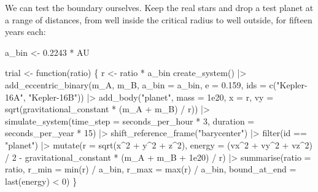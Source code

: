 \documentclass[
  10.5pt,
  letterpaper,
]{scrbook}
\newenvironment{Shaded}{\begin{snugshade}}{\end{snugshade}}
\newcommand{\AttributeTok}[1]{\textcolor[rgb]{0.00,0.00,0.00}{#1}}
\newcommand{\ControlFlowTok}[1]{\textcolor[rgb]{0.00,0.00,0.00}{#1}}
\newcommand{\DecValTok}[1]{\textcolor[rgb]{0.00,0.00,0.00}{#1}}
\newcommand{\FloatTok}[1]{\textcolor[rgb]{0.00,0.00,0.00}{#1}}
\newcommand{\FunctionTok}[1]{\textcolor[rgb]{0.00,0.00,0.00}{#1}}
\newcommand{\NormalTok}[1]{\textcolor[rgb]{0.00,0.00,0.00}{#1}}
\newcommand{\OtherTok}[1]{\textcolor[rgb]{0.00,0.00,0.00}{#1}}
\newcommand{\SpecialCharTok}[1]{\textcolor[rgb]{0.00,0.00,0.00}{#1}}
\newcommand{\StringTok}[1]{\textcolor[rgb]{0.00,0.00,0.00}{#1}}
\theoremstyle{plain}
\theoremstyle{remark}
\begin{document}
We can test the boundary ourselves. Keep the real stars and drop a test
planet at a range of distances, from well inside the critical radius to
well outside, for fifteen years each:

\begin{Shaded}
\begin{Highlighting}[]
\NormalTok{a\_bin }\OtherTok{\textless{}{-}} \FloatTok{0.2243} \SpecialCharTok{*}\NormalTok{ AU}

\NormalTok{trial }\OtherTok{\textless{}{-}} \ControlFlowTok{function}\NormalTok{(ratio) \{}
\NormalTok{  r }\OtherTok{\textless{}{-}}\NormalTok{ ratio }\SpecialCharTok{*}\NormalTok{ a\_bin}
  \FunctionTok{create\_system}\NormalTok{() }\SpecialCharTok{|\textgreater{}}
    \FunctionTok{add\_eccentric\_binary}\NormalTok{(m\_A, m\_B, }\AttributeTok{a\_bin =}\NormalTok{ a\_bin, }\AttributeTok{e =} \FloatTok{0.159}\NormalTok{,}
                         \AttributeTok{ids =} \FunctionTok{c}\NormalTok{(}\StringTok{"Kepler{-}16A"}\NormalTok{, }\StringTok{"Kepler{-}16B"}\NormalTok{)) }\SpecialCharTok{|\textgreater{}}
    \FunctionTok{add\_body}\NormalTok{(}\StringTok{"planet"}\NormalTok{, }\AttributeTok{mass =} \FloatTok{1e20}\NormalTok{, }\AttributeTok{x =}\NormalTok{ r,}
             \AttributeTok{vy =} \FunctionTok{sqrt}\NormalTok{(gravitational\_constant }\SpecialCharTok{*}\NormalTok{ (m\_A }\SpecialCharTok{+}\NormalTok{ m\_B) }\SpecialCharTok{/}\NormalTok{ r)) }\SpecialCharTok{|\textgreater{}}
    \FunctionTok{simulate\_system}\NormalTok{(}\AttributeTok{time\_step =}\NormalTok{ seconds\_per\_hour }\SpecialCharTok{*} \DecValTok{3}\NormalTok{,}
                    \AttributeTok{duration =}\NormalTok{ seconds\_per\_year }\SpecialCharTok{*} \DecValTok{15}\NormalTok{) }\SpecialCharTok{|\textgreater{}}
    \FunctionTok{shift\_reference\_frame}\NormalTok{(}\StringTok{"barycenter"}\NormalTok{) }\SpecialCharTok{|\textgreater{}}
    \FunctionTok{filter}\NormalTok{(id }\SpecialCharTok{==} \StringTok{"planet"}\NormalTok{) }\SpecialCharTok{|\textgreater{}}
    \FunctionTok{mutate}\NormalTok{(}\AttributeTok{r =} \FunctionTok{sqrt}\NormalTok{(x}\SpecialCharTok{\^{}}\DecValTok{2} \SpecialCharTok{+}\NormalTok{ y}\SpecialCharTok{\^{}}\DecValTok{2} \SpecialCharTok{+}\NormalTok{ z}\SpecialCharTok{\^{}}\DecValTok{2}\NormalTok{),}
           \AttributeTok{energy =}\NormalTok{ (vx}\SpecialCharTok{\^{}}\DecValTok{2} \SpecialCharTok{+}\NormalTok{ vy}\SpecialCharTok{\^{}}\DecValTok{2} \SpecialCharTok{+}\NormalTok{ vz}\SpecialCharTok{\^{}}\DecValTok{2}\NormalTok{) }\SpecialCharTok{/} \DecValTok{2} \SpecialCharTok{{-}}
\NormalTok{                    gravitational\_constant }\SpecialCharTok{*}\NormalTok{ (m\_A }\SpecialCharTok{+}\NormalTok{ m\_B }\SpecialCharTok{+} \FloatTok{1e20}\NormalTok{) }\SpecialCharTok{/}\NormalTok{ r) }\SpecialCharTok{|\textgreater{}}
    \FunctionTok{summarise}\NormalTok{(}\AttributeTok{ratio =}\NormalTok{ ratio,}
              \AttributeTok{r\_min =} \FunctionTok{min}\NormalTok{(r) }\SpecialCharTok{/}\NormalTok{ a\_bin, }\AttributeTok{r\_max =} \FunctionTok{max}\NormalTok{(r) }\SpecialCharTok{/}\NormalTok{ a\_bin,}
              \AttributeTok{bound\_at\_end =} \FunctionTok{last}\NormalTok{(energy) }\SpecialCharTok{\textless{}} \DecValTok{0}\NormalTok{)}
\NormalTok{\}}


\end{Highlighting}
\end{Shaded}
\end{document}
